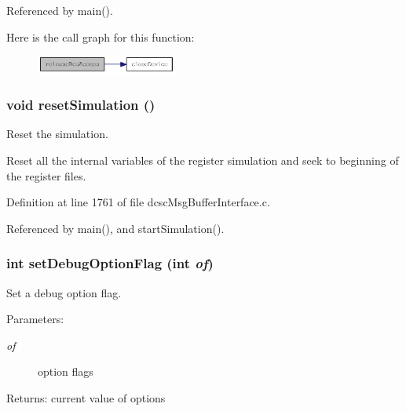 Referenced by main().

Here is the call graph for this function:\begin{figure}[H]
\begin{center}
\leavevmode
\includegraphics[width=131pt]{group__dcsc__msg__buffer__access_gac62a9e57c67af4cb9178b4426ec12fb_cgraph}
\end{center}
\end{figure}
\hypertarget{group__dcsc__msg__buffer__access_gb54d216419ff2c191363373bef5f9cfa}{
\subsubsection[resetSimulation]{\setlength{\rightskip}{0pt plus 5cm}void reset\-Simulation ()}}
\label{group__dcsc__msg__buffer__access_gb54d216419ff2c191363373bef5f9cfa}


Reset the simulation. 

Reset all the internal variables of the register simulation and seek to beginning of the register files. 

Definition at line 1761 of file dcsc\-Msg\-Buffer\-Interface.c.

Referenced by main(), and start\-Simulation().\hypertarget{group__dcsc__msg__buffer__access_g36bb01dae6dd6edf579fe9878f9c6a20}{
\subsubsection[setDebugOptionFlag]{\setlength{\rightskip}{0pt plus 5cm}int set\-Debug\-Option\-Flag (int {\em of})}}
\label{group__dcsc__msg__buffer__access_g36bb01dae6dd6edf579fe9878f9c6a20}


Set a debug option flag. 

\begin{Desc}
\item[Parameters:]
\begin{description}
\item[{\em of}]option flags \end{description}
\end{Desc}
\begin{Desc}
\item[Returns:]current value of options \end{Desc}


